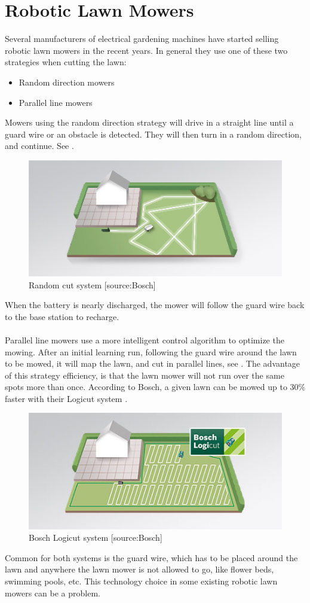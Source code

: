 \section{Robotic Lawn Mowers}\label{roboMowers}
Several manufacturers of electrical gardening machines have started selling robotic lawn mowers in the recent years. In general they use one of these two strategies when cutting the lawn:
\begin{itemize}
	\item Random direction mowers
	\item Parallel line mowers
\end{itemize}
%
Mowers using the random direction strategy will drive in a straight line until a guard wire or an obstacle is detected. They will then turn in a random direction, and continue. See .

\begin{figure}[H]
\centering
\includegraphics[scale=0.8]{figures/noLogiCut.jpg}
\caption{Random cut system [source:Bosch]} 
\label{fig:randomcut}
\end{figure}
\noindent
When the battery is nearly discharged, the mower will follow the guard wire back to the base station to recharge.\\\\
%
Parallel line mowers use a more intelligent control algorithm to optimize the mowing. After an initial learning run, following the guard wire around the lawn to be mowed, it will map the lawn, and cut in parallel lines, see . The advantage of this strategy efficiency, is that the lawn mower will not run over the same spots more than once. According to Bosch, a given lawn can be mowed up to 30\% faster with their Logicut system \cite{Bosch}.

\begin{figure}[H]
\centering
\includegraphics[scale=0.8]{figures/logicut.jpg} 
\caption{Bosch Logicut system [source:Bosch]}
\label{fig:logicut}
\end{figure}
\noindent

Common for both systems is the guard wire, which has to be placed around the lawn and anywhere the lawn mower is not allowed to go, like flower beds, swimming pools, etc. This technology choice in some existing robotic lawn mowers can be a problem.